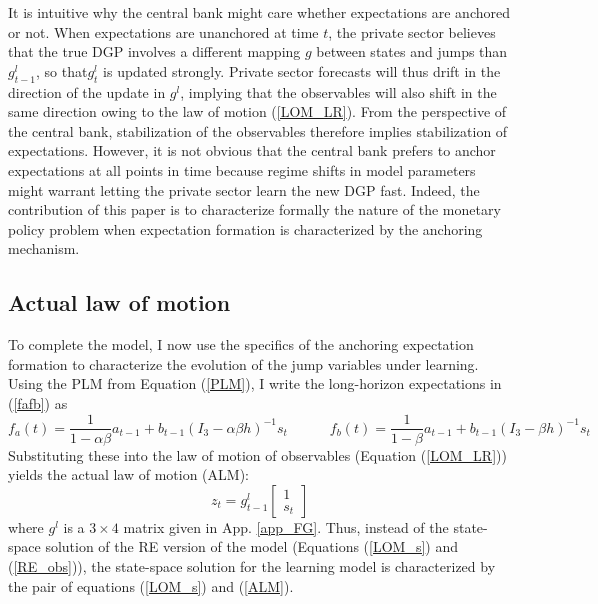 \documentclass[11pt]{article}
\renewcommand{\[}{\begin{equation}}
\renewcommand{\]}{\end{equation}}
\begin{document}
It is intuitive why the central bank might care whether expectations are anchored or not. When expectations are unanchored at time $t$, the private sector believes that the true DGP involves a different mapping $g$ between states and jumps than $g^l_{t-1}$, so that$g^l_t$ is updated strongly. Private sector forecasts will thus drift in the direction of the update in $g^l$, implying that the observables will also shift in the same direction owing to the law of motion (\ref{LOM_LR}). From the perspective of the central bank, stabilization of the observables therefore implies stabilization of expectations. However, it is not obvious that the central bank prefers to anchor expectations at all points in time because regime shifts in model parameters might warrant letting the private sector learn the new DGP fast. Indeed, the contribution of this paper is to characterize formally the nature of the monetary policy problem when expectation formation is characterized by the  anchoring mechanism.

\subsection{Actual law of motion}
To complete the model, I now use the specifics of the anchoring expectation formation to characterize the evolution of the jump variables under learning. Using the PLM from Equation (\ref{PLM}), I write the long-horizon expectations in (\ref{fafb}) as
\begin{equation}
f_a(t) = \frac{1}{1-\alpha\beta}a_{t-1}  + b_{t-1}(I_3 - \alpha\beta h)^{-1}s_t \quad \quad \quad f_b(t) = \frac{1}{1-\beta}a_{t-1}  + b_{t-1}(I_3 - \beta h)^{-1}s_t  \label{fafb_anal}
\end{equation}
Substituting these into the law of motion of observables (Equation (\ref{LOM_LR})) yields the actual law of motion (ALM):
\begin{equation}
z_t = g_{t-1}^l \begin{bmatrix} 1 \\ s_t
\end{bmatrix}
\label{ALM}
\end{equation}
where $g^l$ is a $3\times4$ matrix given in App. \ref{app_FG}. Thus, instead of the state-space solution of the RE version of the model (Equations (\ref{LOM_s}) and (\ref{RE_obs})), the state-space solution for the learning model is characterized by the pair of equations (\ref{LOM_s}) and (\ref{ALM}). 




\end{document}
